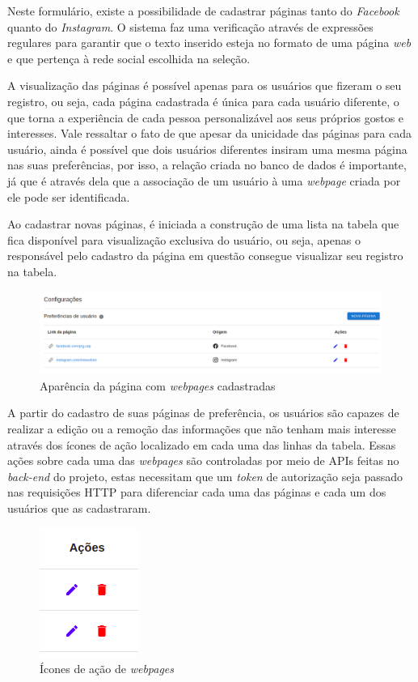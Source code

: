 Neste formulário, existe a possibilidade de cadastrar páginas tanto do
\textit{Facebook} quanto do \textit{Instagram}. O sistema faz uma verificação
através de expressões regulares para garantir que o texto inserido esteja no
formato de uma página \textit{web} e que pertença à rede social escolhida na
seleção.

A visualização das páginas é possível apenas para os usuários que fizeram o seu
registro, ou seja, cada página cadastrada é única para cada usuário diferente,
o que torna a experiência de cada pessoa personalizável aos seus próprios
gostos e interesses. Vale ressaltar o fato de que apesar da unicidade das
páginas para cada usuário, ainda é possível que dois usuários diferentes
insiram uma mesma página nas suas preferências, por isso, a relação
 criada no banco de dados é importante, já que é
através dela que a associação de um usuário à uma \textit{webpage} criada por
ele pode ser identificada.

Ao cadastrar novas páginas, é iniciada a construção de uma lista na tabela que
fica disponível para visualização exclusiva do usuário, ou seja, apenas o
responsável pelo cadastro da página em questão consegue visualizar seu registro
na tabela.

\begin{figure}[h]
    \centering
    \includegraphics[width=1\textwidth]{figuras/webpagesTable.png}
    \caption{Aparência da página com \textit{webpages} cadastradas}
\end{figure}

A partir do cadastro de suas páginas de preferência, os usuários são capazes de
realizar a edição ou a remoção das informações que não tenham mais interesse
através dos ícones de ação localizado em cada uma das linhas da tabela. Essas
ações sobre cada uma das \textit{webpages} são controladas por meio de
\acp{API} feitas no \textit{back-end} do projeto, estas necessitam que um
\textit{token} de autorização seja passado nas requisições \acs{HTTP} para
diferenciar cada uma das páginas e cada um dos usuários que as cadastraram.

\begin{figure}[h]
    \centering
    \includegraphics[scale=.5]{figuras/webpageActions.png}
    \caption{Ícones de ação de \textit{webpages}}
\end{figure}

